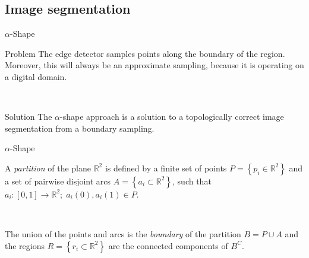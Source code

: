 
    \subsection{Image segmentation}
    \begin{frame}{$\alpha$-Shape}
         {
            \begin{alertblock}{Problem}
                The edge detector samples points along the boundary of the region. Moreover, this will always be an approximate sampling, because it is operating on a digital domain.
            \end{alertblock}
        }
         {
            \begin{exampleblock}{Solution}
                The $\alpha$-shape approach is a solution to a topologically correct image segmentation from a boundary sampling.
            \end{exampleblock}
        }
    \end{frame}
    \begin{frame}{$\alpha$-Shape}
         {
            \begin{definition}
                A \textit{partition} of the plane $\mathbb{R}^2$ is defined by a finite set of points $P = \left\{p_i\in\mathbb{R}^2\right\}$ and a set of pairwise disjoint arcs $A = \left\{a_i \subset \mathbb{R}^2\right\}$, such that $a_i\colon \left[0,1\right] \rightarrow \mathbb{R}^2;\; a_i(0), a_i(1) \in P$.
            \end{definition}
        }
         {
            \begin{definition}
                The union of the points and arcs is the \textit{boundary} of the partition $B = P \cup A$ and the regions $R = \left\{r_i \subset \mathbb{R}^2\right\}$ are the connected components of $B^C$.
            \end{definition}
        }
    \end{frame}
